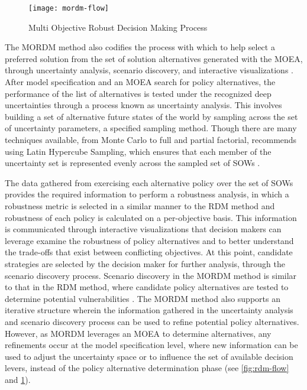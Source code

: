     \begin{figure}[ht]
        \centering
        \captionsetup{justification=centering}
        
        \texttt{[image: mordm-flow]}
        \caption{Multi Objective Robust Decision Making Process}
        \label{fig:mordm-flow}
    \end{figure}

    The MORDM method also codifies the process with which to help select a preferred solution from the set of solution alternatives generated with the MOEA, through uncertainty analysis, scenario discovery, and interactive visualizations \citep{Kasprzyk2013}. After model specification and an MOEA search for policy alternatives, the performance of the list of alternatives is tested under the recognized deep uncertainties through a process known as uncertainty analysis. This involves building a set of alternative future states of the world by sampling across the set of uncertainty parameters, a specified sampling method. Though there are many techniques available, from Monte Carlo to full and partial factorial, \citet{Kasprzyk2013} recommends using Latin Hypercube Sampling, which ensures that each member of the uncertainty set is represented evenly across the sampled set of SOWs \citep{Mckay1979}. 
    
    The data gathered from exercising each alternative policy over the set of SOWs provides the required information to perform a robustness analysis, in which a robustness metric is selected in a similar manner to the RDM method and robustness of each policy is calculated on a per-objective basis. This information is communicated through interactive visualizations that decision makers can leverage examine the robustness of policy alternatives and to better understand the trade-offs that exist between conflicting objectives. At this point, candidate strategies are selected by the decision maker for further analysis, through the scenario discovery process. Scenario discovery in the MORDM method is similar to that in the RDM method, where candidate policy alternatives are tested to determine potential vulnerabilities \citep{Bryant2010}. The MORDM method also supports an iterative structure wherein the information gathered in the uncertainty analysis and scenario discovery process can be used to refine potential policy alternatives. However, as MORDM leverages an MOEA to determine alternatives, any refinements occur at the model specification level, where new information can be used to adjust the uncertainty space or to influence the set of available decision levers, instead of the policy alternative determination phase (see \cref{fig:rdm-flow} and \cref{fig:mordm-flow}). 
    
